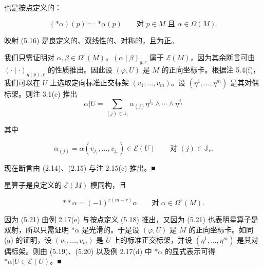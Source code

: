也是按点定义的：

\[
(\ast\alpha)(p) := \ast\alpha(p) \qquad \text{对 } p \in M \text{ 且 } \alpha \in \Omega(M) .
\]

\begin{remark}

\begin{items}
\item

映射 (5.16) 是良定义的、双线性的、对称的，且为正。

\proofhead
我们只需证明对 $ \alpha, \beta \in \Omega^{r}(M) $，$ (\alpha \mid \beta)_{g,r} $ 属于 $ \mathcal{E}(M) $，因为其余断言可由 $ (\cdot \mid \cdot)_{g(p),r} $ 的性质推出。因此设 $ (\varphi, U) $ 是 $ M $ 的正向坐标卡。根据注 5.4(f)，我们可以在 $ U $ 上选取定向标准正交标架 $ (v_{1},\ldots,v_{m}) $。设 $ (\eta^{1},\ldots,\eta^{m}) $ 是其对偶标架。则注 3.1(e) 推出
\begin{equation}
\alpha|U = \sum_{(j)\in\mathbb{J}_{r}} \alpha_{(j)}\eta^{j_{1}} \wedge \cdots \wedge \eta^{j_{r}}\tag{5.19}
\end{equation}

其中

\begin{equation}
\alpha_{(j)} = \alpha(v_{j_{1}},\ldots,v_{j_{r}}) \in \mathcal{E}(U) \qquad \text{对 } (j) \in \mathbb{J}_{r} .\tag{5.20}
\end{equation}

现在断言由 (2.14)、(2.15) 与注 2.15(c) 推出。\nobreak\hspace{0.35em}■

\item

星算子是良定义的 $ \mathcal{E}(M) $ 模同构，且

\begin{equation}
\ast\ast\alpha = (-1)^{r(m-r)}\alpha \qquad \text{对 } \alpha \in \Omega^{r}(M) .\tag{5.21}
\end{equation}

\proofhead
因为 (5.21) 由例 2.17(e) 与按点定义 (5.18) 推出，又因为 (5.21) 也表明星算子是双射，所以只需证明 $ \ast\alpha $ 是光滑的。于是设 $ (\varphi, U) $ 是 $ M $ 的正向坐标卡。如同 (a) 的证明，设 $ (v_{1},\ldots,v_{m}) $ 是 $ U $ 上的标准正交标架，并设 $ (\eta^{1},\ldots,\eta^{m}) $ 是其对偶标架。则由 (5.19)、(5.20) 以及例 2.17(d) 中 $ \ast\alpha $ 的显式表示可得 $ \ast\alpha|U \in \mathcal{E}(U) $。\nobreak\hspace{0.35em}■
\item


\end{items}
\end{remark}
